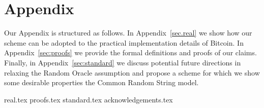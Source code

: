 \section*{Appendix}

Our Appendix is structured as follows. In Appendix~\ref{sec.real} we show how
our scheme can be adopted to the practical implementation details of Bitcoin.
In Appendix~\ref{sec:proofs} we provide the formal definitions and proofs of our
claims. Finally, in Appendix~\ref{sec:standard}
we discuss potential future directions in relaxing the Random Oracle assumption
and propose a scheme for which we show some desirable properties
the Common Random String model.

{real.tex}
{proofs.tex}
{standard.tex}
{acknowledgements.tex}
